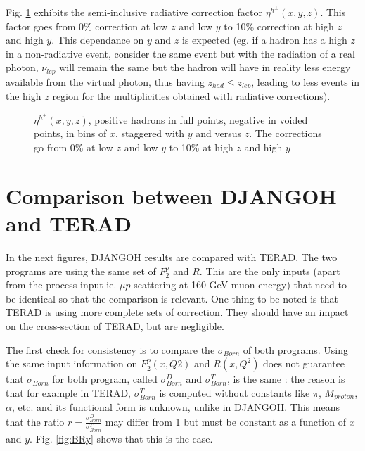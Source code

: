 Fig. \ref{fig:hadz_ratio} exhibits the semi-inclusive radiative correction factor $\eta^{h^{\pm}}(x,y,z)$. This factor goes from 0\% correction
at low $z$ and low $y$ to 10\% correction at high $z$ and high $y$. This dependance on $y$ and $z$ is expected (eg. if a hadron has a high
$z$ in a non-radiative event, consider the same event but with the radiation of a real photon, $\nu_{lep}$ will remain the same but the hadron will have
in reality less energy available from the virtual photon, thus having $z_{had} \leq z_{lep}$, leading to less events in the high $z$ region for the multiplicities
obtained with radiative corrections).

\begin{figure}[!htb]
\centerline{}
\caption{$\eta^{h^{\pm}}(x,y,z)$, positive hadrons in full points, negative in voided points, in bins of $x$, staggered with $y$ and versus $z$.
The corrections go from 0\% at low $z$ and low $y$ to 10\% at high $z$ and high $y$}\label{fig:hadz_ratio}
\end{figure}


\section{Comparison between DJANGOH and TERAD}

In the next figures, DJANGOH results are compared with TERAD\cite{TERAD}. The two programs are using the same set of $F^{p}_{2}$ and $R$. This are the only inputs (apart from the process input ie. $\mu p$ scattering at 160 GeV muon energy) that need to be identical so that the comparison is relevant. One thing to be noted is that TERAD is using more complete sets of correction. They should have an impact on the cross-section of TERAD, but are negligible.

The first check for consistency is to compare the $\sigma_{Born}$ of both programs. Using the same input information on $F^{p}_{2}(x,Q2)$ and $R(x, Q^2)$ does not guarantee that $\sigma_{Born}$ for both program, called $\sigma^{D}_{Born}$ and $\sigma^{T}_{Born}$, is the same : the reason is that for example in TERAD, $\sigma^{T}_{Born}$ is computed without constants like $\pi$, $M_{proton}$, $\alpha$, etc. and its functional form is unknown, unlike in DJANGOH. This means that the ratio $r=\frac{\sigma^{D}_{Born}}{\sigma^{T}_{Born}}$ may differ from 1 but must be constant as a function of $x$ and $y$. Fig. \ref{fig:BRy} shows that this is the case.

